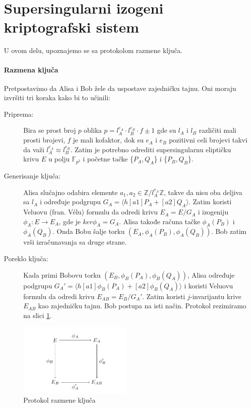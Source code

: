 \documentclass[a4paper]{article}
\begin{document}
\section{Supersingularni izogeni kriptografski sistem}
\label{sec: razmena kljuca}

U ovom delu, upoznajemo se sa protokolom razmene ključa.

\paragraph{Razmena ključa} Pretpostavimo da Alisa i Bob žele da uspostave zajedničku tajnu. Oni moraju izvršiti tri koraka kako bi to učinili:

\begin{description}
	\item[Priprema:] Bira se prost broj $p$ oblika $p = l^{e_A}_{A} \cdot l^{e_B}_{B} \cdot f \pm 1$ gde su $l_{A}$ i  $l_{B}$ različiti mali prosti brojevi, $f$ je mali kofaktor, dok su $e_A$ i $e_B$ pozitivni celi brojevi takvi da važi $l^{e_A}_{A} \approx l^{e_B}_{B}$. Zatim je potrebno odrediti supersingularnu eliptičku krivu $E$ u polju $\mathbb{F}_{p^2}$ i početne tačke \{$P_A, Q_A$\} i \{$P_B, Q_B$\}. 
	
	
	\item[Generisanje ključa:] Alisa slučajno odabira elemente $a_1, a_2 \in \mathbb{Z}/l^{e_A}_{A}\mathbb{Z}$, takve da nisu oba deljiva sa $l_A$ i određuje podgrupu $G_A = \langle h[a1]P_A + [a2]Q_A \rangle $. Zatim koristi Veluovu (fran. V\' elu) \cite{velu} formulu da odredi krivu $E_A = E/G_A$ i izogeniju $\phi_A: E \longrightarrow E_A$, gde je $ker \phi_A = G_A$. Alisa takođe računa tačke $\phi_A(P_B)$ i $\phi_A(Q_B)$. Onda Bobu šalje torku $(E_A, \phi_A(P_B), \phi_A(Q_B))$. Bob zatim vrši izračunavanja sa druge strane.
	
	\item[Poreklo ključa:] Kada primi Bobovu torku $(E_B, \phi_B(P_A), \phi_B(Q_A))$, Alisa određuje podgrupu $G_A' = \langle h[a1]\phi_B(P_A) + [a2]\phi_B(Q_A) \rangle$ i koristi Veluovu formulu da odredi krivu $E_{AB} = E_B / G_A'$. Zatim koristi $j$-invarijantu krive $E_{AB}$ kao zajedničku tajnu. Bob postupa na isti način. Protokol rezimiramo na slici \ref{fig: razmena kljuca}.
	
\end{description}


\begin{figure}[h]
	\centering
	\includegraphics[width=0.5\textwidth]{razmena_kljuca.png}
	\caption{Protokol razmene ključa}
	\label{fig: razmena kljuca}
\end{figure}
\end{document}
